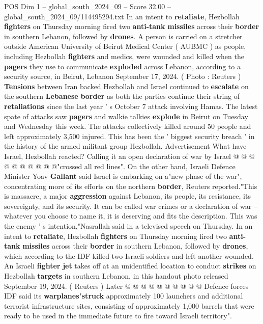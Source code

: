 \begin{textsample}{POS Dim 1 – global\_south\_2024\_09 – Score 32.00 – global\_south\_2024\_09/114495294.txt}  \label{ex:f1_pos_033}
In an intent to \textbf{retaliate}, Hezbollah \textbf{fighters} on Thursday morning fired two \textbf{anti-tank} \textbf{missiles} across their \textbf{border} in southern Lebanon, followed by \textbf{drones}.
A person is carried on a stretcher outside American University of Beirut Medical Center ( AUBMC ) as people, including Hezbollah \textbf{fighters} and medics, were wounded and killed when the \textbf{pagers} they use to communicate \textbf{exploded} across Lebanon, according to a security source, in Beirut, Lebanon September 17, 2024. ( Photo : Reuters ) \textbf{Tensions} between Iran backed Hezbollah and Israel continued to \textbf{escalate} on the southern \textbf{Lebanese} \textbf{border} as both the parties continue their string of \textbf{retaliations} since the last year ' s October 7 attack involving Hamas.
The latest spate of attacks saw \textbf{pagers} and walkie talkies \textbf{explode} in Beirut on Tuesday and Wednesday this week.
The attacks collectively killed around 50 people and left approximately 3,500 injured.
This has been the ' biggest security breach ' in the history of the armed militant group Hezbollah.
Advertisement What have Israel, Hezbollah reacted?
Calling it an open declaration of war by Israel @ @ @ @ @ @ @ @ @ @"crossed all red lines".
On the other hand, Israeli Defence Minister Yoav \textbf{Gallant} said Israel is embarking on a"new phase of the war", concentrating more of its efforts on the northern \textbf{border}, Reuters reported."This is massacre, a major \textbf{aggression} against Lebanon, its people, its resistance, its sovereignty, and its security.
It can be called war crimes or a declaration of war -- whatever you choose to name it, it is deserving and fits the description.
This was the enemy ' s intention,"Nasrallah said in a televised speech on Thursday.
In an intent to \textbf{retaliate}, Hezbollah \textbf{fighters} on Thursday morning fired two \textbf{anti-tank} \textbf{missiles} across their \textbf{border} in southern Lebanon, followed by \textbf{drones}, which according to the IDF killed two Israeli soldiers and left another wounded.
An Israeli \textbf{fighter} \textbf{jet} takes off at an unidentified location to conduct \textbf{strikes} on Hezbollah \textbf{targets} in southern Lebanon, in this handout photo released September 19, 2024. ( Reuters ) Later @ @ @ @ @ @ @ @ @ @ Defence forces IDF said its \textbf{warplanes}"\textbf{struck} approximately 100 launchers and additional terrorist infrastructure sites, consisting of approximately 1,000 barrels that were ready to be used in the immediate future to fire toward Israeli territory".

\end{textsample}
